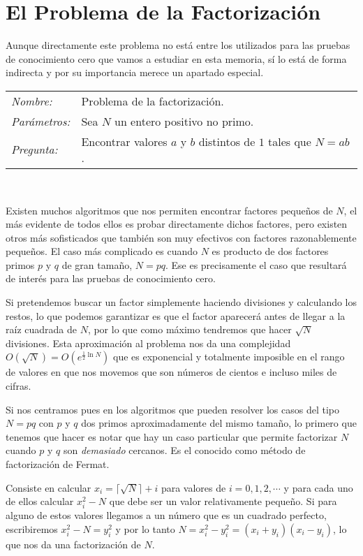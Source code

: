 \section{El Problema de la Factorizaci\'on}

Aunque directamente este problema no est\'a entre los utilizados para las pruebas
de conocimiento cero que vamos a estudiar en esta memoria, s\'i lo est\'a de forma
indirecta y por su importancia merece un apartado especial.

\hfil

\begin{tabular}{|ll}
	\textit{Nombre:} & Problema de la factorizaci\'on. \\
	\textit{Parámetros:} & Sea $N$ un entero positivo no primo. \\
	\textit{Pregunta:} & Encontrar valores $a$ y $b$ distintos de $1$ tales que $N = ab$. \\
\end{tabular}
\\

\hfil

Existen muchos algoritmos que nos permiten encontrar factores peque\~nos de $N$,
el m\'as evidente de todos ellos es probar directamente dichos factores, pero existen otros
m\'as sofisticados que tambi\'en son muy efectivos con factores razonablemente
peque\~nos. El caso m\'as complicado es cuando $N$ es producto de dos factores primos $p$ y $q$
de gran tama\~no, $N = pq$. Ese es precisamente el caso que resultar\'a de
inter\'es para las pruebas de conocimiento cero.

Si pretendemos buscar un factor simplemente haciendo divisiones y calculando los
restos, lo que podemos garantizar es que el factor aparecer\'a antes de llegar a
la ra\'iz cuadrada de $N$, por lo que como m\'aximo tendremos que hacer $\sqrt{N}$
divisiones. Esta aproximaci\'on al problema nos da una complejidad
$O(\sqrt{N}) = O(e^{\frac{1}{2}\ln N})$ que es exponencial y totalmente imposible
en el rango de valores en que nos movemos que son n\'umeros de cientos e incluso
miles de cifras.

Si nos centramos pues en los algoritmos que pueden resolver los casos del tipo
$N = pq$ con $p$ y $q$ dos primos aproximadamente del mismo tama\~no, lo primero que tenemos que
hacer es notar que hay un caso particular que permite factorizar $N$ cuando $p$
y $q$ son {\em demasiado} cercanos. Es el conocido como m\'etodo de factorizaci\'on
de Fermat.

Consiste en calcular $x_i = \lceil\sqrt{N}\rceil + i$ para valores de $i = 0,1,2,\cdots$
y para cada uno de ellos calcular $x_i^2 - N$ que debe ser un valor relativamente peque\~no.
Si para alguno de estos valores llegamos a un n\'umero que es un cuadrado perfecto,
escribiremos $x_i^2 - N = y_i^2$ y por lo tanto $N = x_i^2 - y_i^2 =
(x_i + y_i)(x_i - y_i)$, lo que nos da una factorizaci\'on de $N$.

